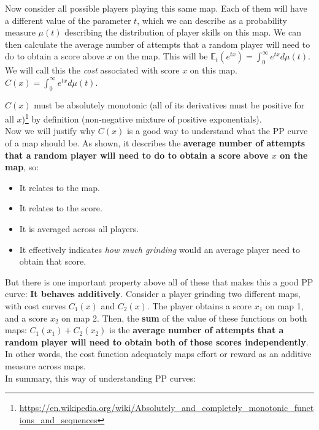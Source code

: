 \documentclass[12pt,a4paper]{article}
\begin{document}
Now consider all possible players playing this same map. Each of them will have a different value of the parameter $t$, which we can describe as a probability measure $\mu(t)$ describing the distribution of player skills on this map. We can then calculate the average number of attempts that a random player will need to do to obtain a score above $x$ on the map. This will be $\mathbb{E}_t(e^{tx}) = \int_0^{\infty} e^{tx} d \mu(t)$. We will call this the {\emph{cost}} associated with score $x$ on this map. $C(x) = \int_0^{\infty} e^{tx} d \mu(t)$.

$C(x)$ must be absolutely monotonic (all of its derivatives must be positive for all $x$)\footnote{\url{https://en.wikipedia.org/wiki/Absolutely_and_completely_monotonic_functions_and_sequences}} by definition (non-negative mixture of positive exponentials).\\

Now we will justify why $C(x)$ is a good way to understand what the PP curve of a map should be. As shown, it describes the {\bf{average number of attempts that a random player will need to do to obtain a score above $x$ on the map}}, so:

\begin{itemize}
\item It relates to the map.
\item It relates to the score.
\item It is averaged across all players.
\item It effectively indicates {\emph{how much grinding}} would an average player need to obtain that score.
\end{itemize}

But there is one important property above all of these that makes this a good PP curve: {\bf{It behaves additively}}. Consider a player grinding two different maps, with cost curves $C_1(x)$ and $C_2(x)$. The player obtains a score $x_1$ on map 1, and a score $x_2$ on map 2. Then, the {\bf{sum}} of the value of these functions on both maps: $C_1(x_1) + C_2(x_2)$ is the {\bf{average number of attempts that a random player will need to obtain both of those scores independently}}. In other words, the cost function adequately maps effort or reward as an additive measure across maps.\\

In summary, this way of understanding PP curves:
\end{document}
